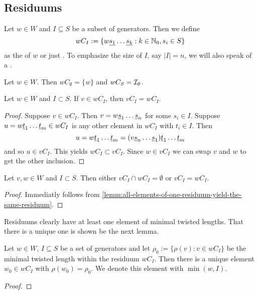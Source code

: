 \subsection{Residuums}
\label{sec:twisted-involutions-residuums}

\begin{defi}
	Let $w \in W$ and $I \subseteq S$ be a subset of generators. Then we define
	$$ wC_I := \{ w \underline{s_1} \ldots \underline{s_k} : k \in \mathbb{N}_0, s_i \in S \} $$
	as the  of $w$ or just . To emphasize the size of $I$, say $|I| = n$, we will also speak of a .
\end{defi}

\begin{exam}
	Let $w \in W$. Then $wC_\emptyset = \{ w \}$ and $wC_S = \mathcal{I}_{\theta}$.
\end{exam}

\begin{lemm}
	Let $w \in W$ and $I \subset S$. If $v \in wC_I$, then $vC_I = wC_I$.

	\begin{proof}
		Suppose $v \in wC_I$. Then $v = w \underline{s}_1 \ldots \underline{s}_n$ for some $s_i \in I$. Suppose $u = w \underline{t}_1 \ldots \underline{t}_m \in wC_I$ is any other element in $wC_I$ with $t_i \in I$. Then
		$$ u = w \underline{t}_1 \ldots \underline{t}_m = (v \underline{s}_n \ldots \underline{s}_1) \underline{t}_1 \ldots \underline{t}_m $$
		and so $u \in vC_I$. This yields $wC_I \subset vC_I$. Since $w \in vC_I$ we can swap $v$ and $w$ to get the other inclusion.
	\end{proof}
\end{lemm}

\begin{coro}
	Let $v, w \in W$ and $I \subset S$. Then either $vC_I \cap wC_I = \emptyset$ or $vC_I = wC_I$.

	\begin{proof}
		Immediatly follows from \ref{lemm:all-elements-of-one-residuum-yield-the-same-residuum}.
	\end{proof}
\end{coro}

Residuums clearly have at least one element of minimal twisted lengths. That there is a unique one is shown be the next lemma.

\begin{lemm}
	Let $w \in W$, $I \subseteq S$ be a set of generators and let $\rho_0 := \{ \rho(v) : v \in wC_I \}$ be the minimal twisted length within the residuum $wC_I$. Then there is a unique element $w_0 \in wC_I$ with $\rho(w_0) = \rho_0$. We denote this element with $\min(w,I)$.

	\begin{proof}
		\todo
	\end{proof}
\end{lemm}

